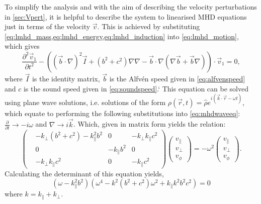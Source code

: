 To simplify the analysis and with the aim of describing the velocity perturbations in \cref{sec:Vpert}, it is helpful to describe the system to linearised MHD equations just in terms of the velocity $\vec{v}$.
This is achieved by substituting \cref{eq:lmhd_mass,eq:lmhd_energy,eq:lmhd_induction} into \cref{eq:lmhd_motion}, which gives
\begin{equation}
    \frac{\partial^2 \vec{v}_1}{\partial t^2} - \left( (\vec{b} \cdot \nabla)^2 \vec{I} + (b^2 + c^2) \nabla\nabla - \vec{b} \cdot \nabla (\nabla\vec{b} + \vec{b}\nabla) \right) \cdot \vec{v}_1 = 0,\label{eq:mhdwaveeq}
\end{equation}
where $\vec{I}$ is the identity matrix, $\vec{b}$ is the Alfv\'en speed given in \cref{eq:alfvenspeed} and $c$ is the sound speed given in \cref{eq:soundspeed}.`
This equation can be solved using plane wave solutions, i.e. solutions of the form $\rho(\vec{r}, t) = \hat{\rho} e^{i(\vec{k}\cdot\vec{r} - \omega t)}$, which equate to performing the following substitutions into \cref{eq:mhdwaveeq}: $\frac{\partial}{\partial t} \rightarrow - i \omega$ and $\nabla \rightarrow i \vec{k}$.
Which, given in matrix form yields the relation:
\begin{equation}
\begin{pmatrix}
    &-k_\perp(b^2+c^2)-k_\parallel^2 b^2			& 0			& -k_\perp k_\parallel c^2\\
    & 0									&-k_\parallel b^2	& 0\\
    &-k_\perp k_\parallel c^2					& 0			& -k_\parallel c^2
\end{pmatrix}
\begin{pmatrix}
v_\parallel\\
v_\perp\\
v_\phi
\end{pmatrix}
= - \omega^2
\begin{pmatrix}
v_\parallel\\
v_\perp\\
v_\phi
\end{pmatrix}.\label{eq:eigenvalue}
\end{equation}
Calculating the determinant of this equation yields,
\begin{equation}
    (\omega - k_\parallel^2 b^2)\left( \omega^4 - k^2(b^2+c^2)\omega^2 + k_\parallel k^2b^2c^2 \right) = 0
\end{equation}
where $k = k_\parallel + k_\perp$.

